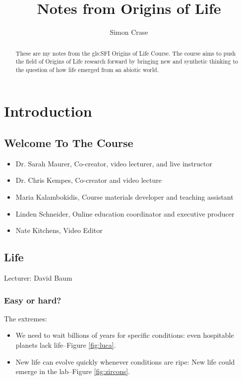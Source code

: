 \documentclass[]{article}
\title{Notes from Origins of Life}
\author{Simon Crase}
\begin{document}
\maketitle

\begin{abstract}
    These are my notes from the \gls{gls:SFI} Origins of Life Course\cite{sfi2019}. The course aims to push the field of Origins of Life research forward by bringing new and synthetic thinking to the question of how life emerged from an abiotic world.

\end{abstract}

\setcounter{tocdepth}{2}
\tableofcontents


\section{Introduction}

\subsection{Welcome To The Course}
\begin{itemize}
	\item Dr. Sarah Maurer, Co-creator, video lecturer, and live instructor
	\item Dr. Chris Kempes, Co-creator and video lecture
	\item Maria Kalambokidis, Course materials developer and teaching assistant
	\item Linden Schneider, Online education coordinator and executive producer
	\item Nate Kitchens, Video Editor
\end{itemize}
\subsection{Life}
Lecturer: David Baum
\subsubsection{Easy or hard?}
The extremes:
\begin{itemize}
	\item We need to wait billions of years for specific conditions: even hospitable planets lack life--Figure \ref{fig:luca}.
	\item New life can evolve quickly whenever conditions are ripe:  New life could emerge in the lab--Figure \ref{fig:zircons}.
\end{itemize}
\end{document}
